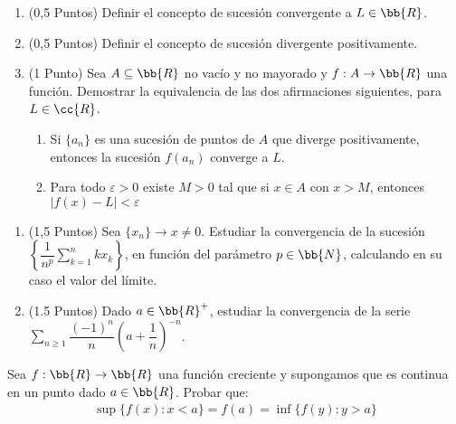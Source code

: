 \documentclass[12pt]{article}
\begin{document}
    \begin{ejercicio}[2 puntos] \phantom{enunciado}
        \begin{enumerate}
            \item (0,5 Puntos) Definir el concepto de sucesión convergente a $L \in \bb{R}$.
            \item (0,5 Puntos) Definir el concepto de sucesión divergente positivamente.
            \item (1 Punto) Sea $A \subseteq \bb{R}$ no vacío y no mayorado y $f : A \rightarrow \bb{R}$ una función. Demostrar la equivalencia de las dos afirmaciones siguientes, para $L \in \cc{R}$.
            \begin{enumerate}
                \item Si $\{a_n\}$ es una sucesión de puntos de $A$ que diverge positivamente, entonces la sucesión $f(a_n)$ converge a $L$.
                \item Para todo $\varepsilon > 0$ existe $M >0$ tal que si $x \in A$ con $x > M$, entonces $|f(x)-L|<\varepsilon$
            \end{enumerate}
        \end{enumerate}
    \end{ejercicio}
    
    \begin{ejercicio}[3 puntos] \phantom{enunciado}
        \begin{enumerate}
            \item (1,5 Puntos) Sea $\{x_n\}\rightarrow x \neq 0$. Estudiar la convergencia de la sucesión $\left\{\displaystyle \dfrac{1}{n^p} \sum\limits_{k=1}^{n}kx_k\right\}$, en función del parámetro $p \in \bb{N}$, calculando en su caso el valor del límite.
            \item (1.5 Puntos) Dado $a \in \bb{R}^+$, estudiar la convergencia de la serie $\displaystyle \sum\limits_{n\geq 1} \dfrac{(-1)^n}{n} \left( a + \dfrac{1}{n} \right) ^{-n}$.
        \end{enumerate}
        
    \end{ejercicio}

    \begin{ejercicio}[1,5 puntos]
        Sea $f : \bb{R} \rightarrow \bb{R}$ una función creciente y supongamos que es continua en un punto dado $a \in \bb{R}$. Probar que:
        \begin{gather*}
            \sup\{f(x): x < a\} = f(a) = \inf\{f(y) : y > a\}
        \end{gather*}
    \end{ejercicio}
\end{document}

